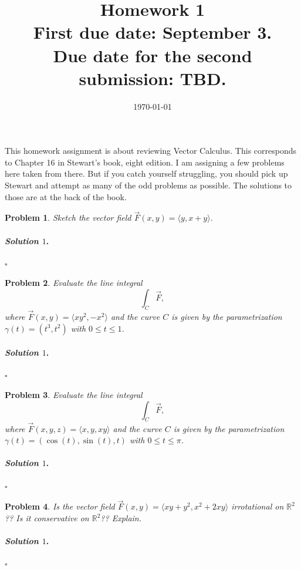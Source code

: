 \documentclass[reqno]{amsart}
\theoremstyle{plain}
\newtheorem{problem}{Problem}
\theoremstyle{definition}
\newenvironment{solution1}{\paragraph{\emph{Solution $1$}.}}{\hfill$\square$}
\begin{document}
 

\title[Homework 1]{Homework 1 \\ First due date: September 3.  \\  Due date for the second submission:  TBD.}

\date{\today} 
\maketitle 

This homework assignment is about reviewing Vector Calculus.  This corresponds to Chapter 16 in Stewart's book, eight edition.  I am assigning a few problems here taken from there.  But if you catch yourself struggling, you should pick up Stewart and attempt as many of the odd problems as possible.  The solutions to those are at the back of the book.

\begin{problem}
Sketch the vector field $\vec{F}(x,y) = \langle y, x+y\rangle$.
\end{problem}
\begin{solution1}

\end{solution1}

\begin{problem}
Evaluate the line integral
$$\int_{C} \vec{F}, $$
where $\vec{F}(x,y) = \langle xy^{2},-x^{2} \rangle$ and the curve $C$ is given by the parametrization $\gamma(t) = (t^{3},t^{2})$ with $0 \le t \le 1$.
\end{problem}
\begin{solution1}

\end{solution1}

\begin{problem}
Evaluate the line integral
$$\int_{C} \vec{F}, $$
where $\vec{F}(x,y,z) = \langle x,y,xy \rangle$ and the curve $C$ is given by the parametrization $\gamma(t) = (\cos(t),\sin(t),t)$ with $0 \le t \le \pi$.
\end{problem}
\begin{solution1}

\end{solution1}

\begin{problem}
Is the vector field $\vec{F}(x,y) = \langle xy +y^2,x^2 + 2xy \rangle$ irrotational on $\mathbb{R}^{2}$??  Is it conservative on $\mathbb{R}^{2}$??  Explain.
\end{problem}
\begin{solution1}

\end{solution1}
\end{document}
